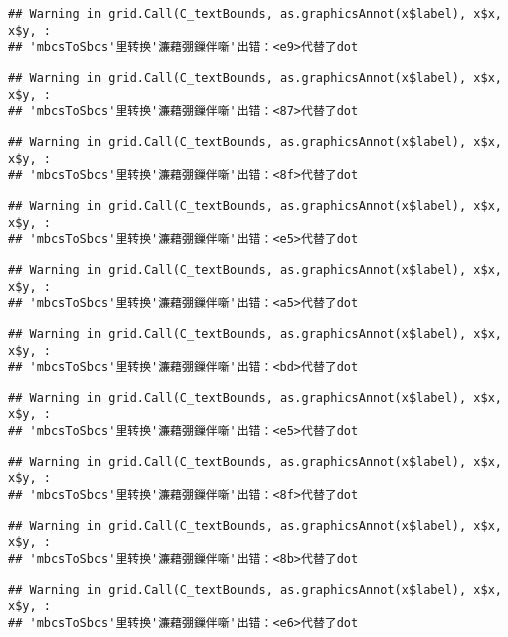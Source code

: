 \documentclass[]{article}
\begin{document}
\begin{verbatim}
## Warning in grid.Call(C_textBounds, as.graphicsAnnot(x$label), x$x, x$y, :
## 'mbcsToSbcs'里转换'濂藉弸鏁伴噺'出错：<e9>代替了dot
\end{verbatim}

\begin{verbatim}
## Warning in grid.Call(C_textBounds, as.graphicsAnnot(x$label), x$x, x$y, :
## 'mbcsToSbcs'里转换'濂藉弸鏁伴噺'出错：<87>代替了dot
\end{verbatim}

\begin{verbatim}
## Warning in grid.Call(C_textBounds, as.graphicsAnnot(x$label), x$x, x$y, :
## 'mbcsToSbcs'里转换'濂藉弸鏁伴噺'出错：<8f>代替了dot
\end{verbatim}

\begin{verbatim}
## Warning in grid.Call(C_textBounds, as.graphicsAnnot(x$label), x$x, x$y, :
## 'mbcsToSbcs'里转换'濂藉弸鏁伴噺'出错：<e5>代替了dot
\end{verbatim}

\begin{verbatim}
## Warning in grid.Call(C_textBounds, as.graphicsAnnot(x$label), x$x, x$y, :
## 'mbcsToSbcs'里转换'濂藉弸鏁伴噺'出错：<a5>代替了dot
\end{verbatim}

\begin{verbatim}
## Warning in grid.Call(C_textBounds, as.graphicsAnnot(x$label), x$x, x$y, :
## 'mbcsToSbcs'里转换'濂藉弸鏁伴噺'出错：<bd>代替了dot
\end{verbatim}

\begin{verbatim}
## Warning in grid.Call(C_textBounds, as.graphicsAnnot(x$label), x$x, x$y, :
## 'mbcsToSbcs'里转换'濂藉弸鏁伴噺'出错：<e5>代替了dot
\end{verbatim}

\begin{verbatim}
## Warning in grid.Call(C_textBounds, as.graphicsAnnot(x$label), x$x, x$y, :
## 'mbcsToSbcs'里转换'濂藉弸鏁伴噺'出错：<8f>代替了dot
\end{verbatim}

\begin{verbatim}
## Warning in grid.Call(C_textBounds, as.graphicsAnnot(x$label), x$x, x$y, :
## 'mbcsToSbcs'里转换'濂藉弸鏁伴噺'出错：<8b>代替了dot
\end{verbatim}

\begin{verbatim}
## Warning in grid.Call(C_textBounds, as.graphicsAnnot(x$label), x$x, x$y, :
## 'mbcsToSbcs'里转换'濂藉弸鏁伴噺'出错：<e6>代替了dot
\end{verbatim}
\end{document}
